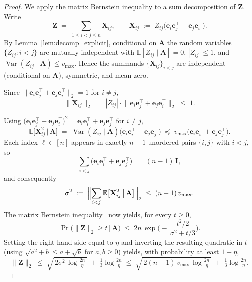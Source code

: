 \documentclass[11pt]{article}
\theoremstyle{plain}
\theoremstyle{definition}
\theoremstyle{remark}
\begin{document}
\begin{proof}
We apply the matrix Bernstein inequality to a sum decomposition of $\mathbf{Z}$. Write
\[
\mathbf{Z} \;=\; \sum_{1\le i<j\le n} \mathbf{X}_{ij},
\qquad 
\mathbf{X}_{ij} \;:=\; Z_{ij}\bigl(\mathbf{e}_i\mathbf{e}_j^{\top} + \mathbf{e}_j\mathbf{e}_i^{\top}\bigr).
\]
By Lemma~\ref{lem:decomp_explicit}, conditional on $\mathbf{A}$ the random variables $\{Z_{ij}:i<j\}$ are mutually independent with $\mathbb{E}[Z_{ij}\mid\mathbf{A}]=0$, $|Z_{ij}|\le 1$, and $\operatorname{Var}(Z_{ij}\mid\mathbf{A})\le v_{\max}$. Hence the summands $\{\mathbf{X}_{ij}\}_{i<j}$ are independent (conditional on $\mathbf{A}$), symmetric, and mean-zero.


Since $\bigl\|\mathbf{e}_i\mathbf{e}_j^{\top} + \mathbf{e}_j\mathbf{e}_i^{\top}\bigr\|_2 = 1$ for $i\ne j$,
\[
\|\mathbf{X}_{ij}\|_2 \;=\; |Z_{ij}|\cdot\bigl\|\mathbf{e}_i\mathbf{e}_j^{\top} + \mathbf{e}_j\mathbf{e}_i^{\top}\bigr\|_2 \;\le\; 1.
\]


Using $\bigl(\mathbf{e}_i\mathbf{e}_j^{\top} + \mathbf{e}_j\mathbf{e}_i^{\top}\bigr)^{\!2} = \mathbf{e}_i\mathbf{e}_i^{\top} + \mathbf{e}_j\mathbf{e}_j^{\top}$ for $i\ne j$,
\[
\mathbb{E}\bigl[\mathbf{X}_{ij}^2 \,\big|\, \mathbf{A}\bigr] 
\;=\; \operatorname{Var}(Z_{ij}\mid\mathbf{A})\bigl(\mathbf{e}_i\mathbf{e}_i^{\top} + \mathbf{e}_j\mathbf{e}_j^{\top}\bigr)
\;\preceq\; v_{\max}\bigl(\mathbf{e}_i\mathbf{e}_i^{\top} + \mathbf{e}_j\mathbf{e}_j^{\top}\bigr).
\]
Each index $\ell\in[n]$ appears in exactly $n-1$ unordered pairs $\{i,j\}$ with $i<j$, so
\[
\sum_{i<j}\bigl(\mathbf{e}_i\mathbf{e}_i^{\top} + \mathbf{e}_j\mathbf{e}_j^{\top}\bigr) \;=\; (n-1)\,\mathbf{I},
\]
and consequently
\[
\sigma^{2} \;:=\; \Bigl\|\sum_{i<j}\mathbb{E}\bigl[\mathbf{X}_{ij}^2 \,\big|\, \mathbf{A}\bigr]\Bigr\|_2
\;\le\; (n-1)\,v_{\max}.
\]
The matrix Bernstein inequality~\citep{vershynin2018high} now yields, for every $t\ge 0$,
\[
\Pr\bigl(\|\mathbf{Z}\|_2 \ge t \,\big|\, \mathbf{A}\bigr) 
\;\le\; 2n\,\exp\!\biggl(-\,\frac{t^{2}/2}{\sigma^{2} + t/3}\biggr).
\]
Setting the right-hand side equal to $\eta$ and inverting the resulting quadratic in $t$ (using $\sqrt{a^{2}+b}\le a+\sqrt{b}$ for $a,b\ge 0$) yields, with probability at least $1-\eta$,
\[
\|\mathbf{Z}\|_2 
\;\le\; \sqrt{\,2\sigma^{2}\,\log\tfrac{2n}{\eta}\,} \;+\; \tfrac{1}{3}\log\tfrac{2n}{\eta}
\;\le\; \sqrt{\,2(n-1)\,v_{\max}\,\log\tfrac{2n}{\eta}\,} \;+\; \tfrac{1}{3}\log\tfrac{2n}{\eta}.
\]
\end{proof}
\end{document}
